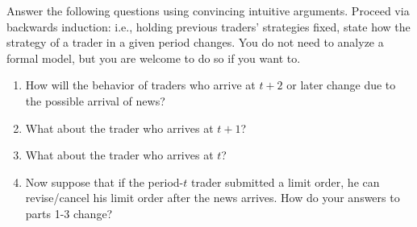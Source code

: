 Answer the following questions using convincing intuitive arguments. Proceed via backwards induction: i.e., holding previous traders' strategies fixed, state how the strategy of a trader in a given period changes. You do not need to analyze a formal model, but you are welcome to do so if you want to. 

\begin{enumerate}%
	\item How will the behavior of traders who arrive at $t+2$ or later change due to the possible arrival of news?
	\item What about the trader who arrives at $t+1$?
	\item What about the trader who arrives at $t$?
	\item Now suppose that if the period-$t$ trader submitted a limit order, he can revise/cancel his limit order after the news arrives. How do your answers to parts 1-3 change?
\end{enumerate}

